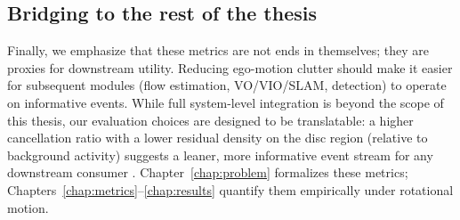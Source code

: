 \subsection{Bridging to the rest of the thesis}
Finally, we emphasize that these metrics are not ends in themselves; they are proxies for downstream utility. Reducing ego-motion clutter should make it easier for subsequent modules (flow estimation, VO/VIO/SLAM, detection) to operate on informative events. While full system-level integration is beyond the scope of this thesis, our evaluation choices are designed to be translatable: a higher cancellation ratio with a lower residual density on the disc region (relative to background activity) suggests a leaner, more informative event stream for any downstream consumer \cite{Gallego2020Survey}. Chapter~\ref{chap:problem} formalizes these metrics; Chapters~\ref{chap:metrics}–\ref{chap:results} quantify them empirically under rotational motion.

